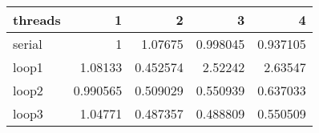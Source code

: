 \begin{tabular}{lrrrr}
\hline
 threads   &        1 &        2 &        3 &        4 \\
\hline
 serial    & 1        & 1.07675  & 0.998045 & 0.937105 \\
 loop1     & 1.08133  & 0.452574 & 2.52242  & 2.63547  \\
 loop2     & 0.990565 & 0.509029 & 0.550939 & 0.637033 \\
 loop3     & 1.04771  & 0.487357 & 0.488809 & 0.550509 \\
\hline
\end{tabular}
